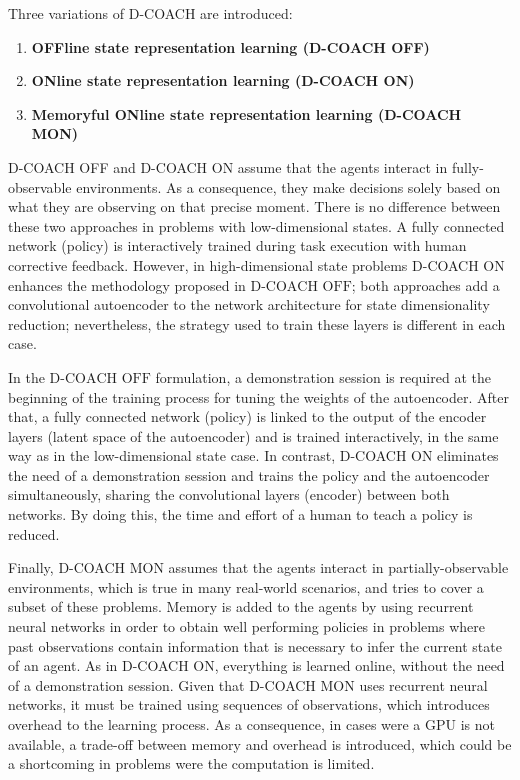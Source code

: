 Three variations of D-COACH are introduced:

\begin{enumerate}
    \item \textbf{OFFline state representation learning (D-COACH OFF)}
    \item \textbf{ONline state representation learning (D-COACH ON)}
    \item \textbf{Memoryful ONline state representation learning (D-COACH MON)}
\end{enumerate}

D-COACH OFF and D-COACH ON assume that the agents interact in fully-observable environments. As a consequence, they make decisions solely based on what they are observing on that precise moment. There is no difference between these two approaches in problems with low-dimensional states. A fully connected network (policy) is interactively trained during task execution with human corrective feedback. However, in high-dimensional state problems D-COACH ON enhances the methodology proposed in $\text{D-COACH OFF}$; both approaches add a convolutional autoencoder to the network architecture for state dimensionality reduction; nevertheless, the strategy used to train these layers is different in each case. 

In the $\text{D-COACH OFF}$ formulation, a demonstration session is required at the beginning of the training process for tuning the weights of the autoencoder. After that, a fully connected network (policy) is linked to the output of the encoder layers (latent space of the autoencoder) and is trained interactively, in the same way as in the low-dimensional state case. In contrast, D-COACH ON eliminates the need of  a demonstration session and trains the policy and the autoencoder simultaneously, sharing the convolutional layers (encoder) between both networks. By doing this, the time and effort of a human to teach a policy is reduced.

Finally, D-COACH MON assumes that the agents interact in partially-observable environments, which is true in many real-world scenarios, and tries to cover a subset of these problems. Memory is added to the agents by using recurrent neural networks in order to obtain well performing policies in problems where past observations contain information that is necessary to infer the current state of an agent. As in D-COACH ON, everything is learned online, without the need of a demonstration session. Given that D-COACH MON uses recurrent neural networks, it must be trained using sequences of observations, which introduces overhead to the learning process. As a consequence, in cases were a GPU is not available, a trade-off between memory and overhead is introduced, which could be a shortcoming in problems were the computation is limited.
